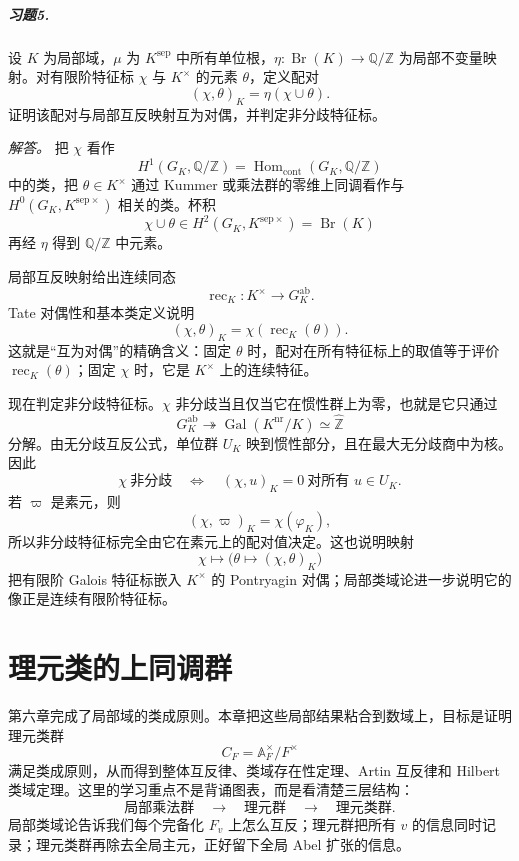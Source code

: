 \documentclass[11pt,a4paper,openany]{ctexbook}
\numberwithin{equation}{chapter}
\newcommand{\Q}{\mathbb{Q}}
\newcommand{\Z}{\mathbb{Z}}
\newcommand{\A}{\mathbb{A}}
\newcommand{\Gal}{\operatorname{Gal}}
\newcommand{\Br}{\operatorname{Br}}
\theoremstyle{plain}
\theoremstyle{definition}
\theoremstyle{remark}
\begin{document}
\paragraph{习题5.}
设 $K$ 为局部域，$\mu$ 为 $K^{\mathrm{sep}}$ 中所有单位根，$\eta:\Br(K)\to\Q/\Z$ 为局部不变量映射。对有限阶特征标 $\chi$ 与 $K^\times$ 的元素 $\theta$，定义配对
\[
(\chi,\theta)_K=\eta(\chi\cup \theta).
\]
证明该配对与局部互反映射互为对偶，并判定非分歧特征标。

\emph{解答。}
把 $\chi$ 看作
\[
H^1(G_K,\Q/\Z)=\operatorname{Hom}_{\mathrm{cont}}(G_K,\Q/\Z)
\]
中的类，把 $\theta\in K^\times$ 通过 Kummer 或乘法群的零维上同调看作与 $H^0(G_K,K^{\mathrm{sep}\times})$ 相关的类。杯积
\[
\chi\cup \theta\in H^2(G_K,K^{\mathrm{sep}\times})=\Br(K)
\]
再经 $\eta$ 得到 $\Q/\Z$ 中元素。

局部互反映射给出连续同态
\[
\operatorname{rec}_K:K^\times\longrightarrow G_K^{\operatorname{ab}}.
\]
Tate 对偶性和基本类定义说明
\[
(\chi,\theta)_K=\chi(\operatorname{rec}_K(\theta)).
\]
这就是“互为对偶”的精确含义：固定 $\theta$ 时，配对在所有特征标上的取值等于评价 $\operatorname{rec}_K(\theta)$；固定 $\chi$ 时，它是 $K^\times$ 上的连续特征。

现在判定非分歧特征标。$\chi$ 非分歧当且仅当它在惯性群上为零，也就是它只通过
\[
G_K^{\operatorname{ab}}\twoheadrightarrow \Gal(K^{\mathrm{nr}}/K)\simeq\widehat{\Z}
\]
分解。由无分歧互反公式，单位群 $U_K$ 映到惯性部分，且在最大无分歧商中为核。因此
\[
\chi\ \text{非分歧}
\quad\Longleftrightarrow\quad
(\chi,u)_K=0\ \text{对所有 }u\in U_K.
\]
若 $\varpi$ 是素元，则
\[
(\chi,\varpi)_K=\chi(\varphi_K),
\]
所以非分歧特征标完全由它在素元上的配对值决定。这也说明映射
\[
\chi\longmapsto \bigl(\theta\mapsto(\chi,\theta)_K\bigr)
\]
把有限阶 Galois 特征标嵌入 $K^\times$ 的 Pontryagin 对偶；局部类域论进一步说明它的像正是连续有限阶特征标。
 \chapter{理元类的上同调群}

第六章完成了局部域的类成原则。本章把这些局部结果粘合到数域上，目标是证明理元类群
\[
C_F=\A_F^\times/F^\times
\]
满足类成原则，从而得到整体互反律、类域存在性定理、Artin 互反律和 Hilbert 类域定理。这里的学习重点不是背诵图表，而是看清楚三层结构：
\[
\text{局部乘法群}\quad\longrightarrow\quad \text{理元群}\quad\longrightarrow\quad \text{理元类群}.
\]
局部类域论告诉我们每个完备化 $F_v$ 上怎么互反；理元群把所有 $v$ 的信息同时记录；理元类群再除去全局主元，正好留下全局 Abel 扩张的信息。
\end{document}
